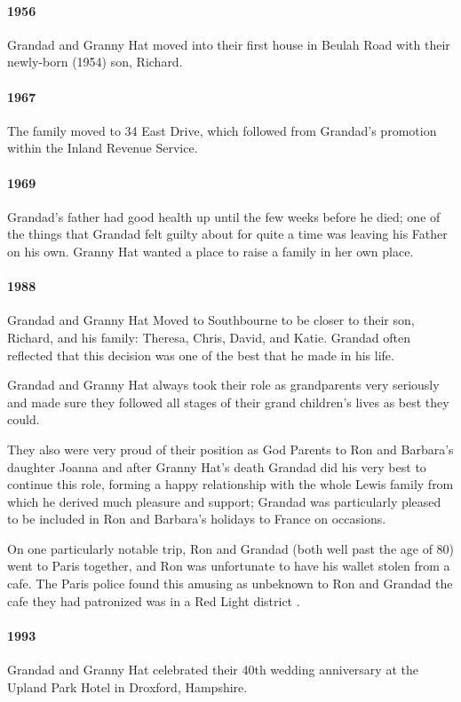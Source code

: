 \paragraph{1956} Grandad and Granny Hat moved into their first house in Beulah Road with their newly-born (1954) son, Richard.
\paragraph{1967} The family moved to 34 East Drive, which followed from Grandad's promotion within
the Inland Revenue Service.
\paragraph{1969} Grandad's father had good health up until the few weeks before he died; one
of the things that Grandad felt guilty about for quite a time was leaving his Father on his own. Granny Hat  wanted
a place to raise a family in her own place.
\paragraph{1988} Grandad and Granny Hat Moved to Southbourne to be closer to their son, Richard, and his family: Theresa, Chris, 
David, and Katie. Grandad often reflected that this decision was one of the best 
that he made in his life. 

Grandad and Granny Hat always took their role as grandparents very seriously and made sure they followed all
stages of their grand children's lives as best they could.

They also were very proud of their position as God
Parents to Ron and Barbara's daughter Joanna and after Granny Hat's death Grandad did his very best to
continue this role, forming a happy relationship with the whole Lewis family from which he derived much pleasure and support;
Grandad was particularly pleased to be included in Ron and Barbara's holidays to France on occasions.

On one particularly notable trip, Ron and Grandad (both well past the age of 80) went to Paris together, and Ron
was unfortunate to have his wallet stolen from a cafe. The Paris police found this amusing
as unbeknown to Ron and Grandad the cafe they had patronized was in a Red Light district .

\paragraph{1993} Grandad and Granny Hat celebrated their 40th wedding anniversary
at the Upland Park Hotel in Droxford, Hampshire.

